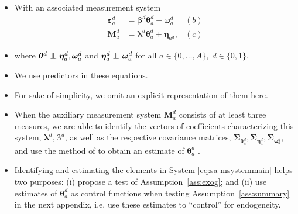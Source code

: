 \documentclass[static]{JJH-Beamer}
\newcommand\independent{\protect\mathpalette{\protect\independenT}{\perp}}
\def\independenT#1#2{\mathrel{\rlap{$#1#2$}\mkern2mu{#1#2}}}
\begin{document}
\begin{frame}

\begin{itemize}
\item With an associated measurement system
    \begin{align}  \label{eq:sa-msystemmain}
    \bm{\varepsilon}_{a}^d &=\bm{\beta}^d \bm{\theta}_{a}^d + \bm{\omega}_{a}^d  &(b) \nonumber \\
    \bm{M}_{a}^d &= \bm{\lambda}^d \bm{\theta}_{a}^d + \bm{\eta}_{a^d},  &(c)
    \end{align}
\item where $\bm{\theta}^d \independent \bm{\eta}_{a}^d, \bm{\omega}_{a}^d$ and $\bm{\eta}_{a}^d \independent \bm{\omega}_{a}^d$ for all $a \in \{0, \ldots, A \}, \; d \in \{0,1\}$.
\item We use predictors in these equations.
\item For sake of simplicity, we omit an explicit representation of them here.
\end{itemize}

\end{frame}

\begin{frame}

\begin{itemize}
\item When the auxiliary measurement system $\bm{M}_{a}^d $ consists of at least three measures, we are able to identify the vectors of coefficients characterizing this system, $\bm{\lambda}^d, \bm{\beta}^d$, as well as the respective covariance matrices, $\bm{\Sigma}_{\bm{\theta}_{a}^d}, \bm{\Sigma}_{\bm{\eta}_{a}^d}, \bm{\Sigma}_{\bm{\omega}_{a}^d}$, and use the method of \citet{Bartlett_1938_Nature} to obtain an estimate of $\bm{\theta}_{a}^d$ \citep{Heckman_Pinto_etal_2013_PerryFactor}.
\item Identifying and estimating the elements in System \eqref{eq:sa-msystemmain} helps two purposes: (i) propose a test of Assumption~\ref{ass:exog}; and (ii) use estimates of $\bm{\theta}_{a}^d$ as control functions when testing Assumption~\ref{ass:summary} in the next appendix, i.e. use these estimates to ``control'' for endogeneity.
\end{itemize}

\end{frame}
\end{document}
